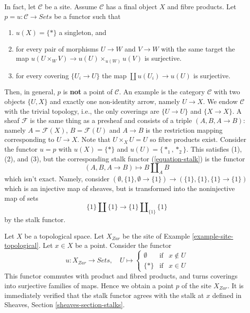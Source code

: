 \begin{remark}
\label{remark-improve-proposition-points-limits}
In fact, let $\mathcal{C}$ be a site. Assume $\mathcal{C}$ has a final object
$X$  and fibre products. Let $p = u: \mathcal{C} \to \textit{Sets}$ be a
functor such that
\begin{enumerate}
\item $u(X) = \{*\}$ a singleton, and
\item for every pair of morphisms $U \to W$ and $V \to W$ with
the same target the map
$u(U \times_W V) \to u(U) \times_{u(W)} u(V)$ is surjective.
\item for every covering $\{U_i \to U\}$ the map
$\coprod u(U_i) \to u(U)$ is surjective.
\end{enumerate}
Then, in general, $p$ is {\bf not} a point of $\mathcal{C}$.
An example is the category $\mathcal{C}$ with two objects $\{U, X\}$
and exactly one non-identity arrow, namely $U \to X$. We endow $\mathcal{C}$
with the trivial topology, i.e., the only coverings are $\{U \to U\}$ and
$\{X \to X\}$. A sheaf $\mathcal{F}$ is the same thing as a presheaf and
consists of a triple $(A, B, A \to B)$: namely $A = \mathcal{F}(X)$,
$B = \mathcal{F}(U)$ and $A \to B$ is the restriction mapping corresponding
to $U \to X$. Note that $U \times_X U = U$ so fibre products exist.
Consider the functor $u = p$ with $u(X) = \{*\}$ and $u(U) = \{*_1, *_2\}$.
This satisfies (1), (2), and (3), but the corresponding stalk functor
(\ref{equation-stalk}) is the functor
$$
(A, B, A \to B) \longmapsto B \coprod\nolimits_A B
$$
which isn't exact. Namely, consider
$(\emptyset, \{1\}, \emptyset \to \{1\}) \to (\{1\}, \{1\}, \{1\} \to \{1\})$
which is an injective map of sheaves, but is transformed into the noninjective
map of sets
$$
\{1\} \coprod \{1\} \longrightarrow \{1\} \coprod\nolimits_{\{1\}} \{1\}
$$
by the stalk functor.
\end{remark}

\begin{example}
\label{example-point-topological}
Let $X$ be a topological space. Let $X_{Zar}$ be the site of
Example \ref{example-site-topological}.
Let $x \in X$ be a point. Consider the functor
$$
u : X_{Zar} \longrightarrow \textit{Sets}, \quad
U \mapsto
\left\{
\begin{matrix}
\emptyset & \text{if} & x \not \in U \\
\{*\} & \text{if} & x \in U
\end{matrix}
\right.
$$
This functor commutes with product and fibred products,
and turns coverings into surjective families of maps.
Hence we obtain a point $p$ of the site $X_{Zar}$.
It is immediately verified that the stalk functor
agrees with the stalk at $x$ defined in
Sheaves, Section
\ref{sheaves-section-stalks}.
\end{example}

